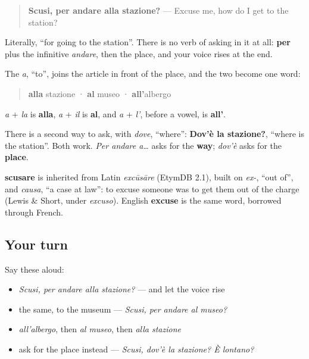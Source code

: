 \begin{grammarlens}[title={Grammar Lens: per andare a…}]
\begin{quote}
\textbf{Scusi, per andare alla stazione?} — Excuse me, how do I get to the station?
\end{quote}

Literally, \textquotedblleft{}for going to the station\textquotedblright{}. There is no verb of asking in it at all: \textbf{per} plus the infinitive \emph{andare}, then the place, and your voice rises at the end.

The \emph{a}, \textquotedblleft{}to\textquotedblright{}, joins the article in front of the place, and the two become one word:

\begin{quote}
\textbf{alla} stazione · \textbf{al} museo · \textbf{all'}albergo
\end{quote}

\emph{a} + \emph{la} is \textbf{alla}, \emph{a} + \emph{il} is \textbf{al}, and \emph{a} + \emph{l'}, before a vowel, is \textbf{all'}.

There is a second way to ask, with \emph{dove}, \textquotedblleft{}where\textquotedblright{}: \textbf{Dov'è la stazione?}, \textquotedblleft{}where is the station\textquotedblright{}. Both work. \emph{Per andare a…} asks for the \textbf{way}; \emph{dov'è} asks for the \textbf{place}.
\end{grammarlens}

\begin{cousinweb}
\textbf{scusare} is inherited from Latin \emph{excūsāre} (EtymDB 2.1), built on \emph{ex-}, \textquotedblleft{}out of\textquotedblright{}, and \emph{causa}, \textquotedblleft{}a case at law\textquotedblright{}: to excuse someone was to get them out of the charge (Lewis \& Short, under \emph{excuso}). English \textbf{excuse} is the same word, borrowed through French.
\end{cousinweb}

\subsection*{Your turn}
Say these aloud:

\begin{itemize}
\raggedright
  \item \emph{Scusi, per andare alla stazione?} — and let the voice rise
  \item the same, to the museum — \emph{Scusi, per andare al museo?}
  \item \emph{all'albergo}, then \emph{al museo}, then \emph{alla stazione}
  \item ask for the place instead — \emph{Scusi, dov'è la stazione? È lontano?}
\end{itemize}

